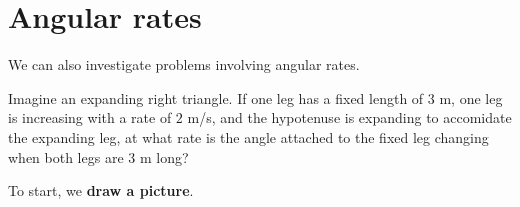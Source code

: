 \documentclass{ximera}
\begin{document}
\section{Angular rates}


We can also investigate problems involving angular rates.

\begin{example}
  Imagine an expanding right triangle. If one leg has a fixed length
  of $3$ m, one leg is increasing with a rate of $2$ m/s, and the
  hypotenuse is expanding to accomidate the expanding leg, at what
  rate is the angle attached to the fixed leg changing when both legs
  are $3$ m long?
  \begin{explanation}
    To start, we \textbf{draw a picture}.
    \begin{image}
    \end{image} 


\end{explanation}
\end{example}
\end{document}
